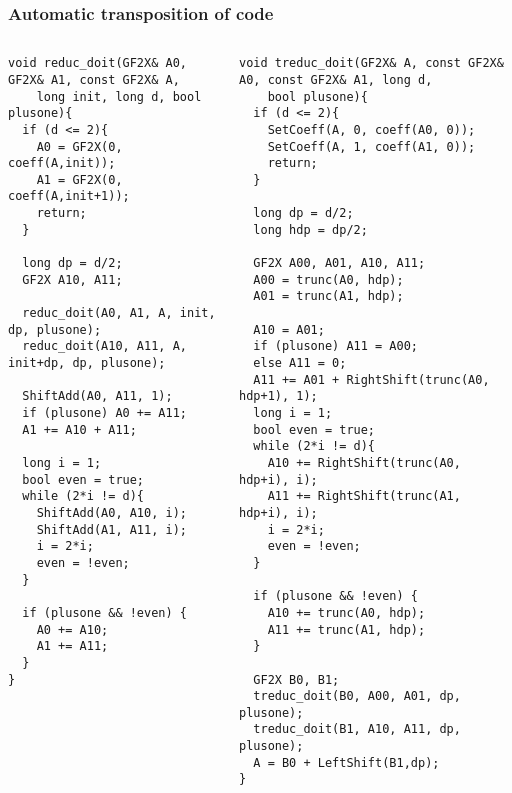 \documentclass[10pt]{beamer}
\begin{document}
\begin{frame}[fragile]
  \tiny
  \frametitle{Automatic transposition of code}

  \begin{columns}
    \begin{column}{0.5\textwidth}
      \begin{center}
        \begin{minipage}{\textwidth}
\begin{verbatim}
void reduc_doit(GF2X& A0, GF2X& A1, const GF2X& A,
	long init, long d, bool plusone){
  if (d <= 2){
    A0 = GF2X(0, coeff(A,init));
    A1 = GF2X(0, coeff(A,init+1));
    return;
  }
   
  long dp = d/2;
  GF2X A10, A11;

  reduc_doit(A0, A1, A, init, dp, plusone);
  reduc_doit(A10, A11, A, init+dp, dp, plusone);
 
  ShiftAdd(A0, A11, 1);
  if (plusone) A0 += A11;
  A1 += A10 + A11;

  long i = 1;
  bool even = true;
  while (2*i != d){
    ShiftAdd(A0, A10, i);
    ShiftAdd(A1, A11, i);
    i = 2*i;
    even = !even;
  }
  
  if (plusone && !even) {
    A0 += A10;
    A1 += A11;
  }
}
\end{verbatim}
        \end{minipage}
      \end{center}
    \end{column}

    \begin{column}{0.5\textwidth}
      \begin{center}
        \begin{minipage}{\textwidth}
\begin{verbatim}
void treduc_doit(GF2X& A, const GF2X& A0, const GF2X& A1, long d,
	bool plusone){
  if (d <= 2){
    SetCoeff(A, 0, coeff(A0, 0));
    SetCoeff(A, 1, coeff(A1, 0));
    return;
  }
   
  long dp = d/2;
  long hdp = dp/2;

  GF2X A00, A01, A10, A11;
  A00 = trunc(A0, hdp);
  A01 = trunc(A1, hdp);

  A10 = A01;
  if (plusone) A11 = A00;
  else A11 = 0;
  A11 += A01 + RightShift(trunc(A0, hdp+1), 1);
  long i = 1;
  bool even = true;
  while (2*i != d){
    A10 += RightShift(trunc(A0, hdp+i), i);
    A11 += RightShift(trunc(A1, hdp+i), i);
    i = 2*i;
    even = !even;
  }
  
  if (plusone && !even) {
    A10 += trunc(A0, hdp);
    A11 += trunc(A1, hdp);
  }
  
  GF2X B0, B1;
  treduc_doit(B0, A00, A01, dp, plusone);
  treduc_doit(B1, A10, A11, dp, plusone);
  A = B0 + LeftShift(B1,dp);
}
\end{verbatim}
        \end{minipage}
      \end{center}
    \end{column}
    \end{columns}
\end{frame}
\end{document}
